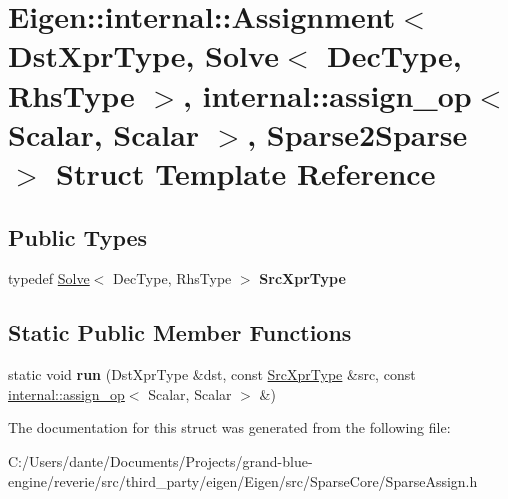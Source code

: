\hypertarget{struct_eigen_1_1internal_1_1_assignment_3_01_dst_xpr_type_00_01_solve_3_01_dec_type_00_01_rhs_tyc354b114c08238e43cfacd9205f4688c}{}\section{Eigen\+::internal\+::Assignment$<$ Dst\+Xpr\+Type, Solve$<$ Dec\+Type, Rhs\+Type $>$, internal\+::assign\+\_\+op$<$ Scalar, Scalar $>$, Sparse2\+Sparse $>$ Struct Template Reference}
\label{struct_eigen_1_1internal_1_1_assignment_3_01_dst_xpr_type_00_01_solve_3_01_dec_type_00_01_rhs_tyc354b114c08238e43cfacd9205f4688c}
\subsection*{Public Types}
\begin{DoxyCompactItemize}
\item 
\mbox{\label{struct_eigen_1_1internal_1_1_assignment_3_01_dst_xpr_type_00_01_solve_3_01_dec_type_00_01_rhs_tyc354b114c08238e43cfacd9205f4688c_a4e946b74dcd1fd648975824e63e39bb7}} 
typedef \mbox{\hyperlink{class_eigen_1_1_solve}{Solve}}$<$ Dec\+Type, Rhs\+Type $>$ {\bfseries Src\+Xpr\+Type}
\end{DoxyCompactItemize}
\subsection*{Static Public Member Functions}
\begin{DoxyCompactItemize}
\item 
\mbox{\label{struct_eigen_1_1internal_1_1_assignment_3_01_dst_xpr_type_00_01_solve_3_01_dec_type_00_01_rhs_tyc354b114c08238e43cfacd9205f4688c_aad63cb7b4a20ee314a3b9d264b86ddd8}} 
static void {\bfseries run} (Dst\+Xpr\+Type \&dst, const \mbox{\hyperlink{class_eigen_1_1_solve}{Src\+Xpr\+Type}} \&src, const \mbox{\hyperlink{struct_eigen_1_1internal_1_1assign__op}{internal\+::assign\+\_\+op}}$<$ Scalar, Scalar $>$ \&)
\end{DoxyCompactItemize}


The documentation for this struct was generated from the following file\+:\begin{DoxyCompactItemize}
\item 
C\+:/\+Users/dante/\+Documents/\+Projects/grand-\/blue-\/engine/reverie/src/third\+\_\+party/eigen/\+Eigen/src/\+Sparse\+Core/Sparse\+Assign.\+h\end{DoxyCompactItemize}
